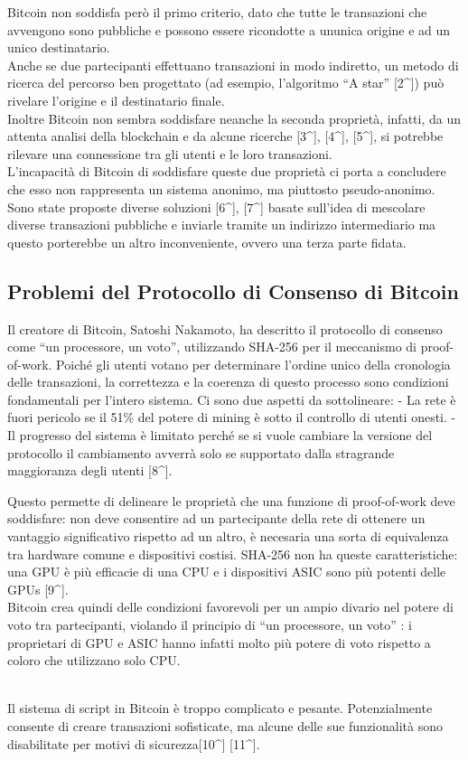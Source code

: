 \documentclass[
]{article}
\begin{document}
Bitcoin non soddisfa però il primo criterio, dato che tutte le
transazioni che avvengono sono pubbliche e possono essere ricondotte a
un\textquotesingle unica origine e ad un unico destinatario.\\
Anche se due partecipanti effettuano transazioni in modo indiretto, un
metodo di ricerca del percorso ben progettato (ad esempio, l'algoritmo
``A star'' {[}2\^{}{]}) può rivelare l'origine e il destinatario
finale.\\
Inoltre Bitcoin non sembra soddisfare neanche la seconda proprietà,
infatti, da un attenta analisi della blockchain e da alcune ricerche
{[}3\^{}{]}, {[}4\^{}{]}, {[}5\^{}{]}, si potrebbe rilevare una
connessione tra gli utenti e le loro transazioni.\\
L'incapacità di Bitcoin di soddisfare queste due proprietà ci porta a
concludere che esso non rappresenta un sistema anonimo, ma piuttosto
pseudo-anonimo. Sono state proposte diverse soluzioni {[}6\^{}{]},
{[}7\^{}{]} basate sull'idea di mescolare diverse transazioni pubbliche
e inviarle tramite un indirizzo intermediario ma questo porterebbe un
altro inconveniente, ovvero una terza parte fidata.

\subsection{Problemi del Protocollo di Consenso di
Bitcoin}\label{problemi-del-protocollo-di-consenso-di-bitcoin}

Il creatore di Bitcoin, Satoshi Nakamoto, ha descritto il protocollo di
consenso come ``un processore, un voto'', utilizzando SHA-256 per il
meccanismo di proof-of-work. Poiché gli utenti votano per determinare
l'ordine unico della cronologia delle transazioni, la correttezza e la
coerenza di questo processo sono condizioni fondamentali per l'intero
sistema. Ci sono due aspetti da sottolineare: - La rete è fuori pericolo
se il 51\% del potere di mining è sotto il controllo di utenti onesti. -
Il progresso del sistema è limitato perché se si vuole cambiare la
versione del protocollo il cambiamento avverrà solo se supportato dalla
stragrande maggioranza degli utenti {[}8\^{}{]}.

Questo permette di delineare le proprietà che una funzione di
proof-of-work deve soddisfare: non deve consentire ad un partecipante
della rete di ottenere un vantaggio significativo rispetto ad un altro,
è necesaria una sorta di equivalenza tra hardware comune e dispositivi
costisi. SHA-256 non ha queste caratteristiche: una GPU è più efficacie
di una CPU e i dispositivi ASIC sono più potenti delle GPUs
{[}9\^{}{]}.\\
Bitcoin crea quindi delle condizioni favorevoli per un ampio divario nel
potere di voto tra partecipanti, violando il principio di ``un
processore, un voto'' : i proprietari di GPU e ASIC hanno infatti molto
più potere di voto rispetto a coloro che utilizzano solo CPU.\\
\strut \\
Il sistema di script in Bitcoin è troppo complicato e pesante.
Potenzialmente consente di creare transazioni sofisticate, ma alcune
delle sue funzionalità sono disabilitate per motivi di
sicurezza{[}10\^{}{]} {[}11\^{}{]}.
\end{document}
